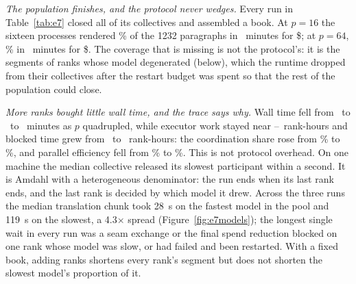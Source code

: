 
\emph{The population finishes, and the protocol never wedges.}  Every run in
Table~\ref{tab:e7} closed all of its collectives and assembled a book.  At
$p=16$ the sixteen processes rendered \eSevenCoverageSixteen\% of the 1232
paragraphs in \eSevenWallSixteen\ minutes for \$\eSevenCostSixteen; at $p=64$,
\eSevenCoverageSixtyfour\% in \eSevenWallSixtyfour\ minutes for
\$\eSevenCostSixtyfour.  The coverage that is missing is not the protocol's:
it is the segments of ranks whose model degenerated (below), which the runtime
dropped from their collectives after the restart budget was spent so that the
rest of the population could close.

\emph{More ranks bought little wall time, and the trace says why.}  Wall time
fell from \eSevenWallSixteen\ to \eSevenWallThirtytwo\ to
\eSevenWallSixtyfour\ minutes as $p$ quadrupled, while executor work stayed near
\eSevenWorkHSixteen--\eSevenWorkHSixtyfour\ rank-hours and blocked time grew
from \eSevenBlockedHSixteen\ to \eSevenBlockedHSixtyfour\ rank-hours: the
coordination share rose from \eSevenCoordShareSixteen\% to
\eSevenCoordShareSixtyfour\%, and parallel efficiency fell from
\eSevenEfficiencySixteen\% to \eSevenEfficiencySixtyfour\%.  This is not
protocol overhead.  On one machine the median collective released its slowest
participant within a second.  It is Amdahl with a heterogeneous denominator:
the run ends when its last rank ends, and the last rank is decided by which
model it drew.  Across the three runs the median translation chunk took
28~s on the fastest model in the pool and 119~s on the slowest, a 4.3$\times$
spread (Figure~\ref{fig:e7models}); the longest single wait in every run was a
seam exchange or the final spend reduction blocked on one rank whose model
was slow, or had failed and been restarted.  With a fixed book, adding ranks
shortens every rank's segment but does not shorten the slowest model's
proportion of it.

